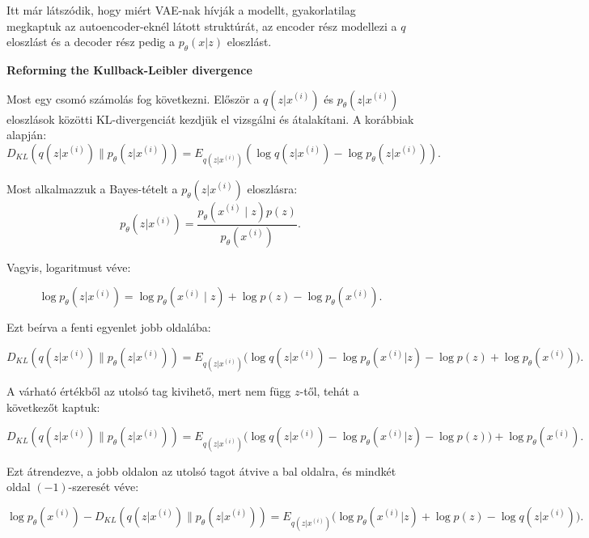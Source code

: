 \documentclass[12pt]{amsart}
\begin{document}
\vspace{5pt}

Itt már látszódik, hogy miért VAE-nak hívják a modellt,
gyakorlatilag megkaptuk az autoencoder-eknél látott
struktúrát, az encoder rész modellezi a $q$ eloszlást és a
decoder rész pedig a $p_\theta(x|z)$ eloszlást.  


\vspace{10pt}

\textbf{Reforming the Kullback-Leibler divergence}

\vspace{10pt}

Most egy csomó számolás fog következni. Először a
$q(z|x^{(i)})$ és $p_\theta(z| x^{(i)})$ eloszlások közötti
KL-divergenciát kezdjük el vizsgálni és átalakítani. A
korábbiak alapján:
\[
  D_{KL}(q(z| x^{(i)}) \| p_\theta(z| x^{(i)})) =
  E_{q(z|x^{(i)})}(\log q(z|x^{(i)})-\log
  p_{\theta}(z| x^{(i)})).
\]

\vspace{5pt}

Most alkalmazzuk a Bayes-tételt a $p_{\theta}(z| x^{(i)})$
eloszlásra:
\[
  p_{\theta}(z| x^{(i)}) = \frac{p_{\theta}(x^{(i)}\mid
    z)p(z)}{p_{\theta}(x^{(i)})}.
\]

\vspace{5pt}

Vagyis, logaritmust véve:

\[
  \log p_{\theta}(z| x^{(i)}) = \log p_{\theta}(x^{(i)}\mid
  z) + \log p(z) - \log p_{\theta}(x^{(i)}).
\]

\vspace{5pt}

Ezt beírva a fenti egyenlet jobb oldalába:

\[
  D_{KL}(q(z| x^{(i)}) \| p_\theta(z| x^{(i)})) =
  E_{q(z|x^{(i)})}\Big(\log q(z|x^{(i)})- \log
  p_{\theta}(x^{(i)}| z)-\log p(z)+ \log
  p_{\theta}(x^{(i)})\Big).
\]

\vspace{5pt}

A várható értékből az utolsó tag kivihető, mert nem függ
$z$-től, tehát a következőt kaptuk:

\[
  D_{KL}(q(z| x^{(i)}) \| p_\theta(z| x^{(i)})) =
  E_{q(z|x^{(i)})}\Big(\log q(z|x^{(i)})- \log
  p_{\theta}(x^{(i)}| z)-\log p(z) \Big) +\log
  p_{\theta}(x^{(i)}).
\]

Ezt átrendezve, a jobb oldalon az utolsó tagot átvive a bal
oldalra, és mindkét oldal $(-1)$-szeresét véve:

\[
  \log p_{\theta}(x^{(i)}) - D_{KL}(q(z| x^{(i)}) \|
  p_\theta(z| x^{(i)})) = E_{q(z|x^{(i)})}\Big( \log
  p_{\theta}(x^{(i)}| z)+ \log p(z)- \log
  q(z|x^{(i)}) \Big).
\]
\end{document}
